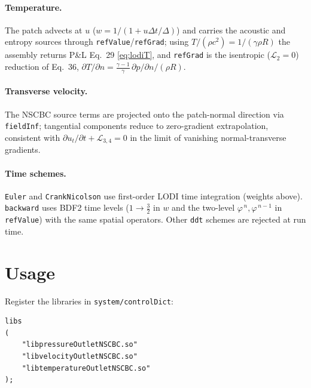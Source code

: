 \documentclass[11pt,a4paper]{article}
\newcommand{\Lc}{\mathcal{L}}
\newcommand{\code}[1]{\texttt{#1}}
\newif\ifvtwo
\begin{document}
\paragraph{Temperature.}
The patch advects at $u$ ($w=1/(1+u\Delta t/\Delta)$) and carries the acoustic
and entropy sources through \code{refValue}/\code{refGrad}; using
$T/(\rho c^2)=1/(\gamma\rho R)$ the assembly returns P\&L Eq.~29
\eqref{eq:lodiT}, and \code{refGrad} is the isentropic ($\Lc_2=0$) reduction of
Eq.~36, $\partial T/\partial n=\tfrac{\gamma-1}{\gamma}\,\partial p/\partial n/(\rho R)$.
\ifvtwo
In this v2412 port the entropy term $T/(\rho c^2)\Lc_2$ is carried by the
convective operator (\code{valueFraction} at speed $u$) plus the
pressure-gradient \code{refGrad}, rather than added explicitly to
\code{refValue}; this avoids double-counting the entropy wave and is equivalent
to Eq.~29.
\fi

\paragraph{Transverse velocity.} The NSCBC source terms are projected onto the
patch-normal direction via \code{fieldInf}; tangential components reduce to
zero-gradient extrapolation, consistent with $\partial u_t/\partial t+\Lc_{3,4}=0$
in the limit of vanishing normal-transverse gradients.

\paragraph{Time schemes.} \code{Euler} and \code{CrankNicolson} use first-order
LODI time integration (weights above). \code{backward} uses BDF2 time levels
($1\to\tfrac32$ in $w$ and the two-level $\varphi^{\,n},\varphi^{\,n-1}$ in
\code{refValue}) with the same spatial operators. Other \code{ddt} schemes are
rejected at run time.

\section{Usage}
Register the libraries in \code{system/controlDict}:
\ifvtwo
\begin{lstlisting}
libs
(
    "libpressureOutletNSCBCNew.so"
    "libvelocityOutletNSCBCNew.so"
    "libtemperatureOutletNSCBCNew.so"
);
\end{lstlisting}
\else
\begin{lstlisting}
libs
(
    "libpressureOutletNSCBC.so"
    "libvelocityOutletNSCBC.so"
    "libtemperatureOutletNSCBC.so"
);
\end{lstlisting}
\fi
\end{document}
